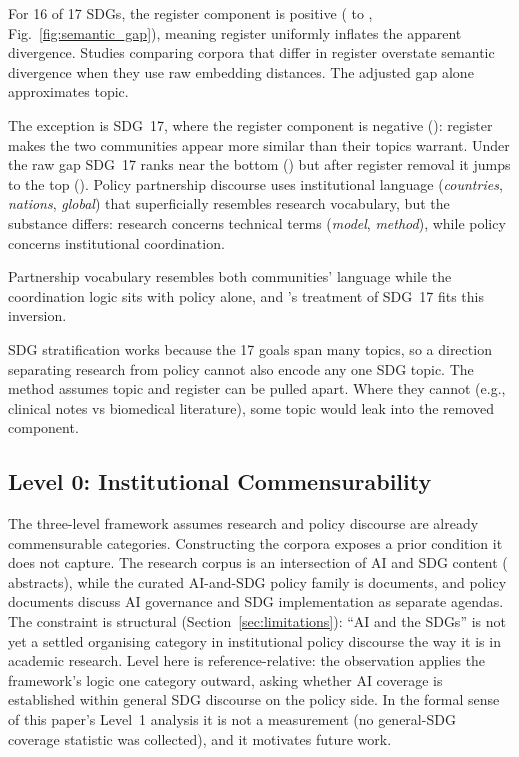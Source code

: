 \documentclass[12pt,a4paper]{article}
\begin{document}
For 16 of 17 SDGs, the register component is positive (\RegCompSdgTen{} to \RegCompSdgThirteen{}, Fig.~\ref{fig:semantic_gap}), meaning register uniformly inflates the apparent divergence. Studies comparing corpora that differ in register overstate semantic divergence when they use raw embedding distances. The adjusted gap alone approximates topic.

The exception is SDG~17, where the register component is negative (\RegCompSdgSeventeen{}): register makes the two communities appear more similar than their topics warrant. Under the raw gap SDG~17 ranks near the bottom (\SemanticGapSdgSeventeen{}) but after register removal it jumps to the top (\AdjGapSdgSeventeen{}). Policy partnership discourse uses institutional language (\textit{countries}, \textit{nations}, \textit{global}) that superficially resembles research vocabulary, but the substance differs: research concerns technical terms (\textit{model}, \textit{method}), while policy concerns institutional coordination.

Partnership vocabulary resembles both communities' language while the coordination logic sits with policy alone, and \textcite{LeBlanc2015}'s treatment of SDG~17 fits this inversion.

 SDG stratification works because the 17 goals span many topics, so a direction separating research from policy cannot also encode any one SDG topic. The method assumes topic and register can be pulled apart. Where they cannot (e.g., clinical notes vs biomedical literature), some topic would leak into the removed component.

\subsection{Level 0: Institutional Commensurability}
\label{sec:level0}

  The three-level framework assumes research and policy discourse are already commensurable categories. Constructing the corpora exposes a prior condition it does not capture. The research corpus is an intersection of AI and SDG content (\NResearchAbstracts{} abstracts), while the curated AI-and-SDG policy family is \PolicyCuratedDocs{} documents, and policy documents discuss AI governance and SDG implementation as separate agendas. The constraint is structural (Section~\ref{sec:limitations}): ``AI and the SDGs'' is not yet a settled organising category in institutional policy discourse the way it is in academic research. Level here is reference-relative: the observation applies the framework's logic one category outward, asking whether AI coverage is established within general SDG discourse on the policy side. In the formal sense of this paper's Level~1 analysis it is not a measurement (no general-SDG coverage statistic was collected), and it motivates future work.
\end{document}
